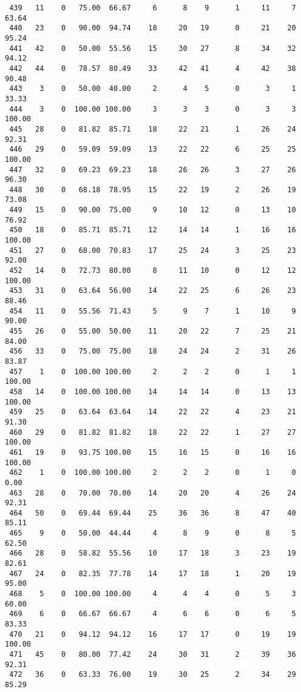 \begin{verbatim}
 439   11    0   75.00  66.67     6      8    9      1     11     7    63.64
 440   23    0   90.00  94.74    18     20   19      0     21    20    95.24
 441   42    0   50.00  55.56    15     30   27      8     34    32    94.12
 442   44    0   78.57  80.49    33     42   41      4     42    38    90.48
 443    3    0   50.00  40.00     2      4    5      0      3     1    33.33
 444    3    0  100.00 100.00     3      3    3      0      3     3   100.00
 445   28    0   81.82  85.71    18     22   21      1     26    24    92.31
 446   29    0   59.09  59.09    13     22   22      6     25    25   100.00
 447   32    0   69.23  69.23    18     26   26      3     27    26    96.30
 448   30    0   68.18  78.95    15     22   19      2     26    19    73.08
 449   15    0   90.00  75.00     9     10   12      0     13    10    76.92
 450   18    0   85.71  85.71    12     14   14      1     16    16   100.00
 451   27    0   68.00  70.83    17     25   24      3     25    23    92.00
 452   14    0   72.73  80.00     8     11   10      0     12    12   100.00
 453   31    0   63.64  56.00    14     22   25      6     26    23    88.46
 454   11    0   55.56  71.43     5      9    7      1     10     9    90.00
 455   26    0   55.00  50.00    11     20   22      7     25    21    84.00
 456   33    0   75.00  75.00    18     24   24      2     31    26    83.87
 457    1    0  100.00 100.00     2      2    2      0      1     1   100.00
 458   14    0  100.00 100.00    14     14   14      0     13    13   100.00
 459   25    0   63.64  63.64    14     22   22      4     23    21    91.30
 460   29    0   81.82  81.82    18     22   22      1     27    27   100.00
 461   19    0   93.75 100.00    15     16   15      0     16    16   100.00
 462    1    0  100.00 100.00     2      2    2      0      1     0     0.00
 463   28    0   70.00  70.00    14     20   20      4     26    24    92.31
 464   50    0   69.44  69.44    25     36   36      8     47    40    85.11
 465    9    0   50.00  44.44     4      8    9      0      8     5    62.50
 466   28    0   58.82  55.56    10     17   18      3     23    19    82.61
 467   24    0   82.35  77.78    14     17   18      1     20    19    95.00
 468    5    0  100.00 100.00     4      4    4      0      5     3    60.00
 469    6    0   66.67  66.67     4      6    6      0      6     5    83.33
 470   21    0   94.12  94.12    16     17   17      0     19    19   100.00
 471   45    0   80.00  77.42    24     30   31      2     39    36    92.31
 472   36    0   63.33  76.00    19     30   25      2     34    29    85.29

\end{verbatim}
